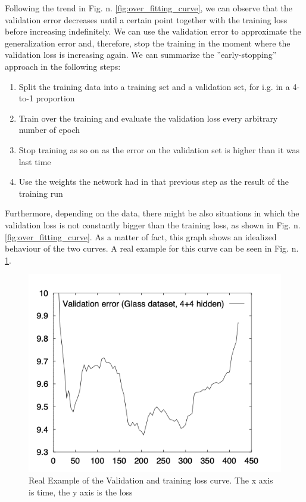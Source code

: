 Following the trend in Fig. n. \ref{fig:over_fitting_curve}, we can observe that the validation error decreases until a certain point together with the training loss before increasing indefinitely. We can use the validation error to approximate the generalization error and, therefore, stop the training in the moment where the validation loss is increasing again. 
We can summarize the ''early-stopping'' approach in the following steps:
\begin{enumerate}
\item Split the training data into a training set and a validation set, for i.g. in a 4-to-1 proportion
\item Train over the training and evaluate the validation loss every arbitrary number of epoch
\item Stop training as so on as the error on the validation set is         higher than it was last time
\item Use the weights the network had in that previous step as the result of the training run

\end{enumerate}
Furthermore, depending on the data, there might be also situations in which the validation loss is not constantly bigger than the training loss, as shown in Fig. n. \ref{fig:over_fitting_curve}. As a matter of fact, this graph shows an idealized behaviour of the two curves. A real example for this curve can be seen in Fig. n. \ref{fig:over_fitting_curve_real}.
\begin{figure}[htb]
    \centering
    \includegraphics[scale = 0.4]{img/over_fitting_real.png}
    \caption[Real Example of the Validation and training loss curve]{Real Example of the Validation and training loss curve. The x axis is time, the y axis is the loss \cite{early_stopping}}
    \label{fig:over_fitting_curve_real}
\end{figure}

